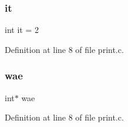 \subsubsection{it}
{\footnotesize\ttfamily int it = 2}



Definition at line 8 of file print.\+c.

\mbox{\label{print_8c_a74e13fe359ab4d26eea47074de2257a2}} 
\subsubsection{wae}
{\footnotesize\ttfamily int$\ast$ wae}



Definition at line 8 of file print.\+c.

